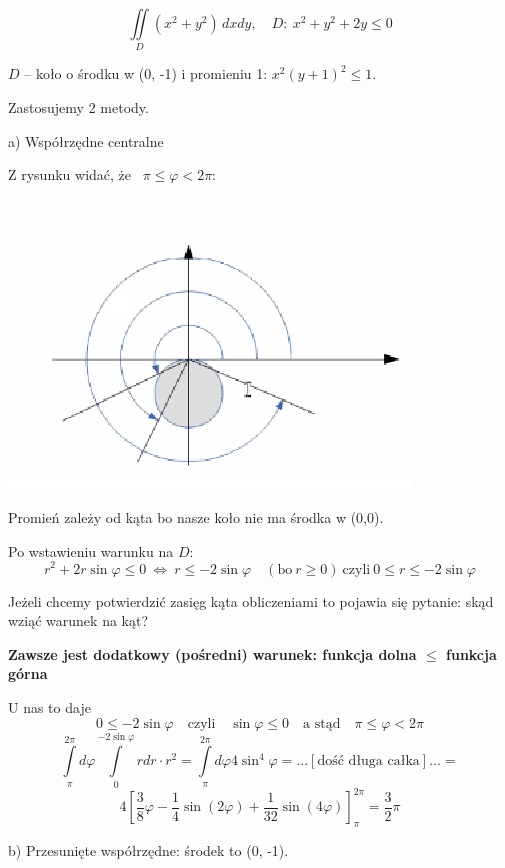 \begin{przykladbig}
    \[ \iint\limits_D (x^2 + y^2) \, dxdy, \quad D: \ x^2 + y^2 + 2y \leq 0 \]

    $D$ -- koło o środku w (0, -1) i promieniu 1: $ x^2 (y+1)^2 \leq 1 $.

    Zastosujemy 2 metody. \bigskip

    a) Współrzędne centralne

    Z rysunku widać, że \ $ \pi \leq \varphi < 2\pi $:

    \includegraphics[scale=0.5]{img/kolkakat.png}

    Promień zależy od kąta bo nasze koło nie ma środka w (0,0).

    Po wstawieniu warunku na $D$:
    \[ r^2 + 2r \sin \varphi \leq 0 \ \Leftrightarrow \ r \leq -2 \sin \varphi \quad (\textrm{bo} \ r \geq 0) \ \textrm{czyli} \ 0 \leq r \leq -2 \sin \varphi \]

    Jeżeli chcemy potwierdzić zasięg kąta obliczeniami to pojawia się pytanie: skąd wziąć warunek na kąt? \bigskip

    \textbf{Zawsze jest dodatkowy (pośredni) warunek: funkcja dolna $ \leq $ funkcja górna}

    U nas to daje
    \[ 0 \leq -2 \sin \varphi \quad \textrm{czyli} \quad \sin \varphi \leq 0 \quad \textrm{a stąd} \quad \pi \leq \varphi < 2 \pi \]
    \[ \int\limits_{\pi}^{2\pi} d \varphi \int\limits_{0}^{-2\sin\varphi} rdr \cdot r^2 = \int\limits_{\pi}^{2\pi} d \varphi 4 \sin^4 \varphi = 
    ...[\text{dość długa całka}]... = \]
    \[ 4 \left[ \frac{3}{8}\varphi - \frac{1}{4}\sin(2\varphi) + \frac{1}{32}\sin(4\varphi) \right]_{\pi}^{2\pi} = \frac{3}{2}\pi \]

    \bigskip
    b) Przesunięte współrzędne: środek to (0, -1).


\end{przykladbig}
